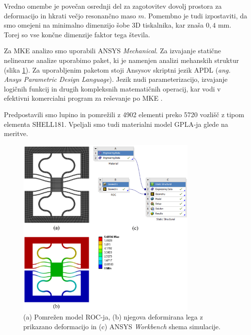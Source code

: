         
        
        
        Vredno omembe je povečan osrednji del za zagotovitev dovolj prostora za deformacijo in hkrati večjo resonančno maso $m$. Pomembno je tudi izpostaviti, da smo omejeni na minimalno dimenzijo šobe 3D tiskalnika, kar znaša $0,4$ mm. Torej so vse končne dimenzije faktor tega števila. 

        Za MKE analizo smo uporabili ANSYS \textit{Mechanical}. Za izvajanje statične nelinearne analize uporabimo paket, ki je namenjen analizi mehanskih struktur (slika \ref{fig:MKE_statika}). Za uporabljenim paketom stoji Ansysov skriptni jezik APDL (\textit{ang. Ansys Parametric Design Language}). Jezik nudi parameterizacijo, izvajanje logičnih funkcij in drugih kompleksnih matematičnih operacij, kar vodi v efektivni komercialni program za reševanje po MKE \cite{thompson2017ansys}. 
        
        Predpostavili smo lupino in pomrežili z 4902 elementi preko 5720 vozlišč z tipom elementa SHELL181. Vpeljali smo tudi materialni model GPLA-ja glede na meritve. 
        
        \begin{figure}[!hb]
            \centering
            \includegraphics[trim={0.0cm 0.0cm 0.0cm -2.0cm}, clip, width=0.8\textwidth]{Magisterski praktikum/slike/metodologija/MKE_statika.png}
            \caption{(a) Pomrežen model ROC-ja, (b) njegova deformirana lega z prikazano deformacijo in (c) ANSYS \textit{Workbench} shema simulacije.}\label{fig:MKE_statika}
        \end{figure}

